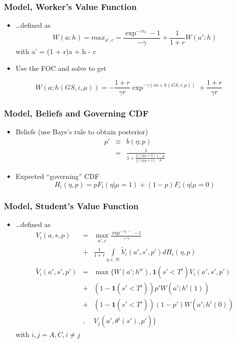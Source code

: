 \begin{frame}
	\frametitle{Model, Worker's Value Function}
		\begin{itemize}
			\item \ldots defined as
		\begin{equation}
			W(a;h) = max_{a',c} = \frac{\exp ^{- \gamma c_{t}} - 1}{- \gamma} + \frac{1}{1 + r} W(a';h)
		\end{equation}
\noindent with a' = (1 + r)a + h - c
			\item Use the FOC and solve to get
		\end{itemize}
			\begin{equation}
				W(a; h(GS, i, \mu)) = - \frac{1+r}{\gamma r} \exp^ {- \gamma (ra +  h(GS, i, \mu) )} + \frac{1+r}{\gamma r}			
			\end{equation}
\end{frame}

\begin{frame}
	\frametitle{Model, Beliefs and Governing CDF}
		\begin{itemize}
			\item Beliefs (use Baye's rule to obtain posterior)
				\begin{eqnarray}
					p ' &\equiv& b(\eta; p) \nonumber \\
						&=& \frac{1}{1 + \frac{f_{i}(\eta|\mu=0)}{f_{i}(\eta|\mu=1)} \frac{1-p}{p}}
				\end{eqnarray}
			\item Expected ``governing'' CDF
				\begin{equation}
					H_{i}(\eta, p) = p F_{i} (\eta | \mu = 1) + (1 - p) F_{i} (\eta | \mu = 0) 
				\end{equation}
		\end{itemize}
\end{frame}

\begin{frame}
	\frametitle{Model, Student's Value Function}
		\begin{itemize}
			\item \ldots defined as
				\begin{eqnarray}
				V_{i}(a,s,p) &=& \max_{a',c} \frac{\exp ^{- \gamma c_{t} -} - 1}{- \gamma} \nonumber \\  
				             &+& \frac{1}{1+r} \int \limits _{\eta \in \mathcal{H}} \tilde{V}_{i} (a',s',p') dH_{i}(\eta,p) \\
				 \tilde{V}_{i} (a',s',p') &=& \max \{ W(a'; h^w), \mathbf{1}(s' < T^i) V_{i}(a',s',p') \nonumber \\ 
				  &+& (1 - \mathbf{1}(s' < T^i)) p'W(a';h^i(1)) \nonumber \\       &+& (1 - \mathbf{1}(s' < T^i)) (1-p')W(a';h^i(0))   \nonumber \\      &,& V_{j}(a', \theta^i(s'),p')\}        
				\end{eqnarray}
\noindent with $i,j = A,C, i \neq j$
		\end{itemize}
\end{frame}

